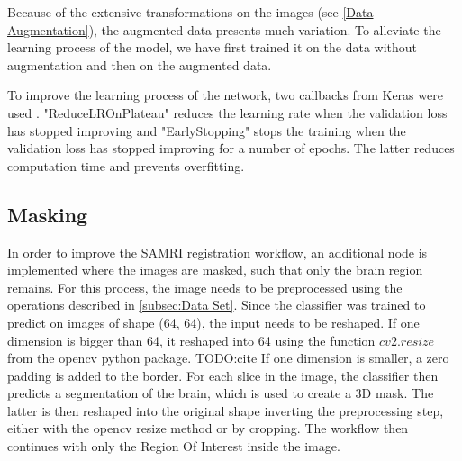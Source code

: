 Because of the extensive transformations on the images (see \cref{Data Augmentation}), the augmented data presents much variation.
To alleviate the learning process of the model, we have first trained it on the data without augmentation and then on the augmented data.

To improve the learning process of the network, two callbacks from Keras were used \cite{noauthor_callbacks_nodate}. "ReduceLROnPlateau" reduces the learning rate when the validation loss has stopped improving and "EarlyStopping" stops the training when the validation loss has stopped improving for a number of epochs.
The latter reduces computation time and prevents overfitting.

\subsection{Masking}
In order to improve the SAMRI registration workflow, an additional node is implemented where the images are masked, such that only the brain region remains.
For this process, the image needs to be preprocessed using the operations described in \cref{subsec:Data Set}.
Since the classifier was trained to predict on images of shape (64, 64), the input needs to be reshaped.
If one dimension is bigger than 64, it reshaped into 64 using the function \textcolor{mg}{\texttt{$cv2.resize$}} from the opencv python package. TODO:cite
If one dimension is smaller, a zero padding is added to the border.
For each slice in the image, the classifier then predicts a segmentation of the brain, which is used to create a 3D mask.
The latter is then reshaped into the original shape inverting the preprocessing step, either with the opencv resize method or by cropping.
The workflow then continues with only the Region Of Interest inside the image.
